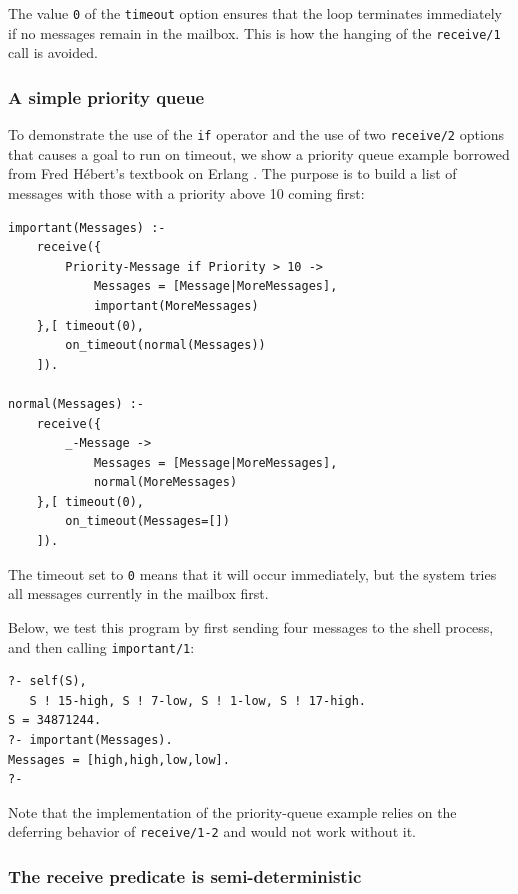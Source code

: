 \noindent The value \texttt{0} of the \texttt{timeout} option ensures that the loop terminates immediately if no messages remain in the mailbox. This is how the hanging of the \texttt{receive/1} call is avoided.

\subsubsection{A simple priority queue}\label{sec:priority-queue}

To demonstrate the use of the \texttt{if} operator and the use of two \texttt{receive/2} options that causes a goal to run on timeout, we show a priority queue example borrowed from Fred H\'ebert's textbook on Erlang \cite{Hebert:2013:LYE:2543986}. The purpose is to build a list of messages with those with a priority above 10 coming first:

\begin{verbatim}
important(Messages) :-
    receive({
        Priority-Message if Priority > 10 ->
            Messages = [Message|MoreMessages],
            important(MoreMessages)
    },[ timeout(0),
        on_timeout(normal(Messages))
    ]).

normal(Messages) :-
    receive({
        _-Message ->
            Messages = [Message|MoreMessages],
            normal(MoreMessages)
    },[ timeout(0),
        on_timeout(Messages=[])
    ]).
\end{verbatim}

\noindent The timeout set to \texttt{0} means that it will occur immediately, but the system tries all messages currently in the mailbox first.

Below, we test this program by first sending four messages to the shell process, and then calling \texttt{important/1}:

\begin{verbatim}
?- self(S),
   S ! 15-high, S ! 7-low, S ! 1-low, S ! 17-high.
S = 34871244.
?- important(Messages).
Messages = [high,high,low,low].
?- 
\end{verbatim}

\noindent Note that the implementation of the priority-queue example relies on the deferring behavior of \texttt{receive/1-2} and would not work without it.

\subsubsection{The receive predicate is semi-deterministic}

